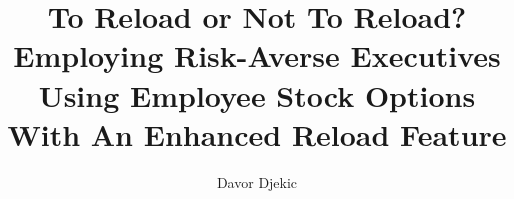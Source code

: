\documentclass[12pt]{article}
\title{To Reload or Not To Reload?\\ Employing Risk-Averse Executives Using Employee Stock Options With An Enhanced Reload Feature}
\author{Davor Djekic}
\begin{document}
    \maketitle
    \newpage


    \tableofcontents


    
    
    
    
    
    
    

    \listoffigures
    \listoftables
    \newpage
  
    \nocite{*}
    \printbibliography

    
\end{document}
